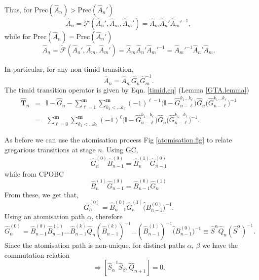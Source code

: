 \documentclass[11pt]{article}
\newcommand{\hA}{\hat { A}}
\newcommand{\hG}{\hat G}
\newcommand{\pre}{\mathrm{Prec}}
\newcommand{\hhT}{\hat A}
\newcommand{\hTi}{\widehat{\mathbf{T}}}
\newcommand{\tcF}{\widetilde{\mathcal F}}
\newcommand{\bmm}{{\mathbf m}}
\newcommand{\id}{\mathbb I}
\newcommand{\h}{\hat}
\begin{document}
Thus, for $\pre(\hA_n)> \pre(\hA_n')$ 
\begin{equation} 
\hhT_n =\tcF(\hhT_n',\hhT_m,\hhT_m') = \hhT_m\hhT_n'  \hhT_m'^{-1},
\end{equation}
while for $\pre(\hA_n)= \pre(\hA_n')$ 
\begin{equation} 
\hhT_n =\tcF(\hhT_n',\hhT_m,\hhT_m') = \hhT_m\hhT_n'  \hhT_m'^{-1}=
\hhT_m'^{-1}\hhT_n'  \hhT_m.
\end{equation}

In particular, for  any non-timid transition,
\begin{equation}
\hA_n=\hA_m\hG_n  \hG_m^{-1}. \label{nontimidcpobc.eq}
  \end{equation} 
The timid transition operator is given by Eqn. \eqref{timid.eq} (Lemma \ref{GTA.lemma}) 
\begin{eqnarray} 
  \hTi_n&=&\id-\hG_n-\sum_{\ell=1}^\bmm \sum_{k_1<\ldots k_\ell}^\bmm
            (-1)^{\ell -1}
            \biggl(\id -\hG_{n-\ell}^{k_1\ldots
            k_\ell}\biggr)\hG_n\biggl(\hG_{n-\ell}^{k_1\ldots
            k_\ell}\biggr)^{-1}  \nonumber \\
  &=& \sum_{\ell=0}^\bmm \sum_{k_1<\ldots
      k_\ell}^\bmm  (-1)^{\ell} \biggl(\id - \hG_{n-\ell}^{k_1\ldots
            k_\ell}\biggr) \hG_n\biggl(\hG_{n-\ell}^{k_1\ldots
            k_\ell}\biggr)^{-1}.  \label{timidcpobc.eq} 
\end{eqnarray} 

As before we can use the atomisation process  Fig \ref{atomisation.fig} to relate
gregarious transitions at stage $n$.       
Using GC,  
\begin{eqnarray}
\h G_{n}^{(0)} \h B_{n-1}^{(0)}= \h B_{n}^{(1)} \h G_{n-1}^{(0)} 
\end{eqnarray}
while from CPOBC
\begin{equation}
\h B_{n}^{(1)} \h G_{n-1}^{(0)} = \h B_{n-1}^{(0)} \h G_{n}^{(1)}  
\end{equation}
From these, we get that, 
\begin{equation}\label{CPOBCconj.eq}
\h G_{n}^{(0)}=\h B_{n-1}^{(0)}\h G_{n}^{(1)}\h
(B_{n-1}^{(0)})^{-1}. 
\end{equation}
Using an  atomisation path $\alpha$, therefore 
\begin{equation}
  \h G_{n}^{(0)}=\h B_{n-1}^{(0)}\h B_{n-1}^{(1)} \ldots \h
  B_{n-1}^{(k)}\h Q_{n} (\h B_{n-1}^{(k)})^{-1} \ldots (\h B_{n-1}^{(1)})^{-1} \h
  (B_{n-1}^{(0)})^{-1} \equiv \h S^{\alpha} \h Q_{n} (\h
  S^{\alpha})^{-1}. \label{gregcpobc.eq} 
\end{equation}
Since the atomisation path is non-unique, for distinct paths $\alpha$,
$\beta$ we have the commutation relation 
\begin{equation} 
\Rightarrow [\h S_\alpha^{-1}\h S_\beta,\h Q_{n+1}]=
0. \label{salphasbeta.eq} 
\end{equation} 
\end{document}
